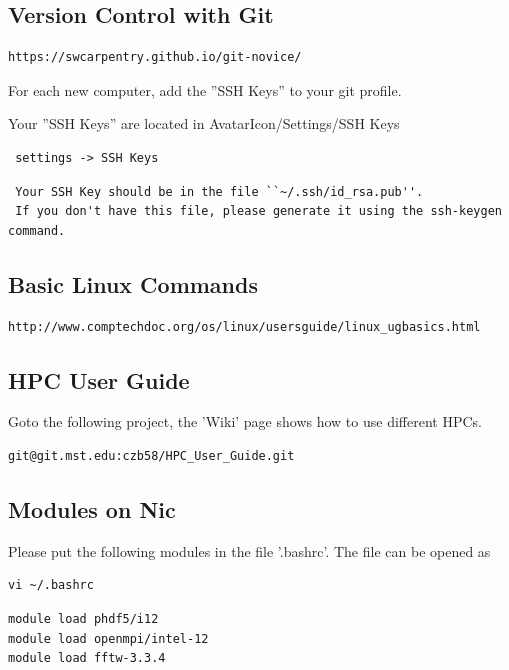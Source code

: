 \documentclass[12pt, oneside]{article}
\begin{document}
\subsection{Version Control with Git}
\begin{verbatim}
https://swcarpentry.github.io/git-novice/
\end{verbatim}

For each new computer, add the ''SSH Keys'' to your git profile.

Your ''SSH Keys'' are located in AvatarIcon/Settings/SSH Keys 

\begin{verbatim}
 settings -> SSH Keys
\end{verbatim}
\begin{verbatim}
 Your SSH Key should be in the file ``~/.ssh/id_rsa.pub''. 
 If you don't have this file, please generate it using the ssh-keygen command.
\end{verbatim}




\subsection{Basic Linux Commands}
\begin{verbatim}
http://www.comptechdoc.org/os/linux/usersguide/linux_ugbasics.html
\end{verbatim}


\subsection{HPC User Guide}

Goto the following project, the 'Wiki' page shows how to use different HPCs.

 \begin{verbatim}
git@git.mst.edu:czb58/HPC_User_Guide.git
 \end{verbatim}
 

\subsection{Modules on Nic}

Please put the following modules in the file '.bashrc'. The file can be opened as
\begin{verbatim}
vi ~/.bashrc 
\end{verbatim}
\begin{verbatim}
module load phdf5/i12
module load openmpi/intel-12
module load fftw-3.3.4
\end{verbatim}
  
  
% 
% 
% 
% 
\end{document}
